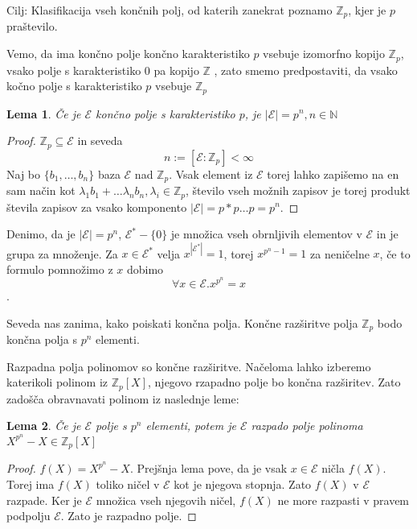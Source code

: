 \documentclass[a4paper]{article}
\newtheorem{lemma}{Lema}
\begin{document}
Cilj: Klasifikacija vseh končnih polj, od katerih zanekrat poznamo $\mathbb{Z}_p$, kjer je $p$ praštevilo.

Vemo, da ima končno polje končno karakteristiko $p$ vsebuje izomorfno kopijo $\mathbb{Z}_p$, vsako polje s karakteristiko $0$ pa kopijo $\mathbb{Z}$%
, zato smemo predpostaviti, da vsako kočno polje s karakteristiko $p$ vsebuje $\mathbb{Z}_p$

\begin{lemma}
Če je $\mathcal{E}$ končno polje s karakteristiko $p$, je $|\mathcal{E}| = p^n, n \in \mathbb{N}$
\end{lemma}

\begin{proof}
$\mathbb{Z}_p \subseteq \mathcal{E}$ in seveda $$n:=[\mathcal{E}:\mathbb{Z}_p] < \infty$$
Naj bo $\{b_1, \dots, b_n \}$ baza $\mathcal{E}$ nad $\mathbb{Z}_p$. Vsak element iz $\mathcal{E}$ torej lahko zapišemo na en sam način kot $\lambda_1 b_1 + \dots \lambda_n b_n, \lambda_i \in \mathbb{Z}_p$, število vseh možnih zapisov je torej produkt števila zapisov za vsako komponento $|\mathcal{E}| = p * p \dots p = p^n$.
\end{proof}
Denimo, da je $|\mathcal{E}| = p^n$, $\mathcal{E}^* - \{0\}$ je množica vseh obrnljivih elementov v $\mathcal{E}$ in je grupa za množenje. Za $x \in \mathcal{E}^*$ velja $x^{|\mathcal{E}^*|} = 1$, torej $x^{p^n-1} = 1$ za neničelne $x$, če to formulo pomnožimo z $x$ dobimo $$\forall x \in \mathcal{E}. x^{p^n} = x$$.

Seveda nas zanima, kako poiskati končna polja. Končne razširitve polja $\mathbb{Z}_p$ bodo končna polja s $p^n$ elementi.

Razpadna polja polinomov so končne razširitve. Načeloma lahko izberemo katerikoli polinom iz $\mathbb{Z}_p[X]$, njegovo rzapadno polje bo končna razširitev. Zato zadošča obravnavati polinom iz naslednje leme:

\begin{lemma}
Če je $\mathcal{E}$ polje s $p^n$ elementi, potem je $\mathcal{E}$  
razpado polje polinoma $X^{p^n} - X \in \mathbb{Z}_p[X]$ 
\end{lemma}

\begin{proof}
$f(X) = X^{p^n} - X$. Prejšnja lema pove, da je vsak $x \in \mathcal{E}$ ničla $f(X)$. Torej ima $f(X)$ toliko ničel v $\mathcal{E}$ kot je njegova stopnja. Zato $f(X)$ v $\mathcal{E}$ razpade. Ker je $\mathcal{E}$ množica vseh njegovih ničel, $f(X)$ ne more razpasti v pravem podpolju $\mathcal{E}$. Zato je razpadno polje.
\end{proof}
\end{document}
